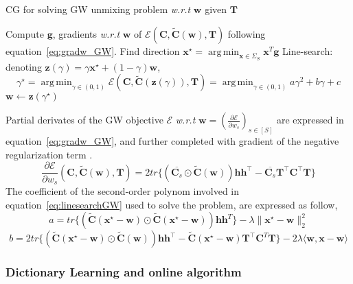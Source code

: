 \documentclass{article}
\newcommand{\scalar}[2]{\langle #1 , #2 \rangle}
\def\eqref#1{equation~\ref{#1}}
\def\vg{{\bm{g}}}
\def\vh{{\bm{h}}}
\def\vw{{\bm{w}}}
\def\vx{{\bm{x}}}
\def\vz{{\bm{z}}}
\def\mC{{\bm{C}}}
\def\mT{{\bm{T}}}
\DeclareMathOperator*{\argmin}{arg\,min}
\begin{document}
	\begin{algorithm}[H]
		\caption{CG for solving GW unmixing problem \emph{w.r.t} $\vw$ given $\mT$}
		\label{alg:CGw}
		\begin{algorithmic}[1]
			\REPEAT
			\STATE Compute $\vg$, gradients  \emph{w.r.t} $\vw$ of $\mathcal{E}(\mC, \widetilde{\mC}(\vw),\mT)$ following \eqref{eq:gradw_GW}.
			\STATE Find direction $\vx^{\star}= \argmin_{\vx\in \Sigma_S} \vx^T\vg$ 
			\STATE Line-search: denoting $\vz(\gamma) = \gamma \vx^{\star} + (1 - \gamma)\vw$,
			\begin{equation}\label{eq:linesearchGW}
			\gamma^\star = \argmin_{\gamma \in (0,1)} \mathcal{E}(\mC,\widetilde{\mC}(\vz(\gamma)), \mT)= \argmin_{\gamma \in (0,1)} a \gamma^2 + b \gamma +c
			\end{equation}
			\STATE $\vw \leftarrow \vz(\gamma^\star)$
		\end{algorithmic}
	\end{algorithm}
	
	Partial derivates of the GW objective $\mathcal{E}$ \emph{w.r.t} $\vw = (\frac{\partial \mathcal{E} }{\partial w_s})_{s \in [S]}$ are expressed in \eqref{eq:gradw_GW}, and further completed with gradient of the negative regularization term .
	\begin{equation} \label{eq:gradw_GW}
	\frac{\partial \mathcal{E} }{\partial w_s}(\mC,\widetilde{\mC}(\vw),\mT) = 2tr\{ \left(\overline{\mC_s} \odot \widetilde{\mC}(\vw)\right) \vh \vh^\top - \overline{\mC_s} \mT^{\top} \mC^\top \mT \}
	\end{equation}
	The coefficient of the second-order polynom involved in \eqref{eq:linesearchGW} used to solve the problem, are expressed as follow,
	\begin{equation}
	a= tr\{ \left(\widetilde{\mC}(\vx^\star - \vw) \odot \widetilde{\mC}(\vx^\star - \vw)\right)\vh\vh^T \}- \lambda \| \vx^\star- \vw\|_2^2
	\end{equation}
	\begin{equation}
	b= 2tr\{\left( \widetilde{\mC}(\vx^\star - \vw) \odot \widetilde{\mC}(\vw)\right)\vh \vh^\top - \widetilde{\mC}(\vx^\star - \vw)\mT^{\top}\mC^T \mT\}- 2 \lambda \scalar{\vw}{\vx-\vw}
	\end{equation}
	
	\subsubsection{Dictionary Learning and online algorithm}
	
\end{document}
